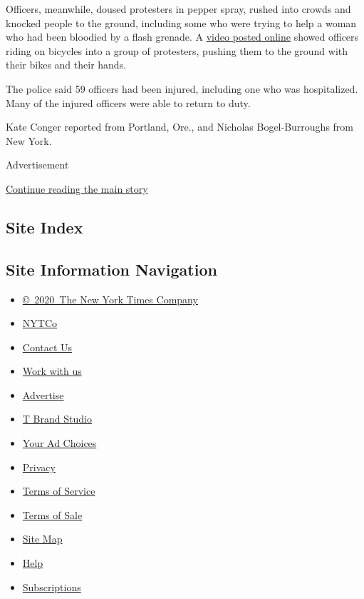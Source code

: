 Officers, meanwhile, doused protesters in pepper spray, rushed into
crowds and knocked people to the ground, including some who were trying
to help a woman who had been bloodied by a flash grenade. A
\href{https://twitter.com/slydesilva/status/1287240894219841536?s=20}{video
posted online} showed officers riding on bicycles into a group of
protesters, pushing them to the ground with their bikes and their hands.

The police said 59 officers had been injured, including one who was
hospitalized. Many of the injured officers were able to return to duty.

Kate Conger reported from Portland, Ore., and Nicholas Bogel-Burroughs
from New York.

Advertisement

\protect\hyperlink{after-bottom}{Continue reading the main story}

\hypertarget{site-index}{%
\subsection{Site Index}\label{site-index}}

\hypertarget{site-information-navigation}{%
\subsection{Site Information
Navigation}\label{site-information-navigation}}

\begin{itemize}
\tightlist
\item
  \href{https://help.nytimes.com/hc/en-us/articles/115014792127-Copyright-notice}{©~2020~The
  New York Times Company}
\end{itemize}

\begin{itemize}
\tightlist
\item
  \href{https://www.nytco.com/}{NYTCo}
\item
  \href{https://help.nytimes.com/hc/en-us/articles/115015385887-Contact-Us}{Contact
  Us}
\item
  \href{https://www.nytco.com/careers/}{Work with us}
\item
  \href{https://nytmediakit.com/}{Advertise}
\item
  \href{http://www.tbrandstudio.com/}{T Brand Studio}
\item
  \href{https://www.nytimes.com/privacy/cookie-policy\#how-do-i-manage-trackers}{Your
  Ad Choices}
\item
  \href{https://www.nytimes.com/privacy}{Privacy}
\item
  \href{https://help.nytimes.com/hc/en-us/articles/115014893428-Terms-of-service}{Terms
  of Service}
\item
  \href{https://help.nytimes.com/hc/en-us/articles/115014893968-Terms-of-sale}{Terms
  of Sale}
\item
  \href{https://spiderbites.nytimes.com}{Site Map}
\item
  \href{https://help.nytimes.com/hc/en-us}{Help}
\item
  \href{https://www.nytimes.com/subscription?campaignId=37WXW}{Subscriptions}
\end{itemize}
